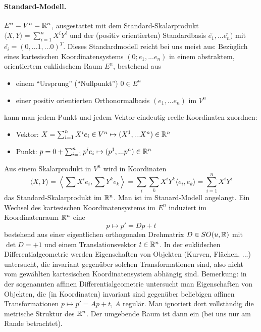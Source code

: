   \paragraph*{Standard-Modell.} \(E^n = V^n = \mathbb{R}^n\), ausgestattet mit dem Standard-Skalarprodukt \(\langle X, Y \rangle = \sum_{i=1}^n X^iY^i\) und der (positiv orientierten) Standardbasis \(\overset{\circ}{e_1}, ... \overset{\circ}{e_n})\) mit \(\overset{\circ}{e_i} = (0, ... 1, ... 0)^T\).
  Dieses Standardmodell reicht bei uns meist aus:
  Bezüglich eines kartesischen Koordinatensystems \((0; e_1, ... e_n)\) in einem abstraktem, orientiertem euklidschem Raum \(E^n\), bestehend aus 
  \begin{itemize}
   \item einem "`Ursprung"' ("`Nullpunkt"') \(0 \in E^n\)
   \item einer positiv orientierten Orthonormalbasis \((e_1, ... e_n)\) im \(V^n\)
  \end{itemize}
  kann man jedem Punkt und jedem Vektor eindeutig reelle Koordinaten zuordnen:
  \begin{itemize}
   \item Vektor: \(X = \sum_{i=1}^n X^ie_i \in V^n \mapsto (X^1, ... X^n) \in \mathbb{R}^n\)
   \item Punkt: \(p = 0 + \sum_{i=1}^n p^ie_i \mapsto (p^1, ... p^n) \in \mathbb{R}^n\)
  \end{itemize}
  Aus einem Skalarprodukt in \(V^n\) wird in Koordinaten
  \[
   \langle X, Y \rangle = \left\langle \sum X^ie_i, \sum Y^ke_k \right\rangle = \sum_{i}\sum_{k} X^iY^k \langle e_i, e_k \rangle = \sum_{i=1}^n X^iY^i
  \]
  das Standard-Skalarprodukt im \(\mathbb{R}^n\).
  Man ist im Stanard-Modell angelangt.
  Ein Wechsel des kartesischen Koordinatensystems im \(E^n\) induziert im Koordinatenraum \(\mathbb{R}^n\) eine  \[p \mapsto p' = Dp + t\] bestehend aus einer eigentlichen orthogonalen Drehmatrix \(D \in SO(u, \mathbb{R})\) mit \(\det D = +1\) und einem Translationsvektor \(t \in \mathbb{R}^n\).
  In der euklidschen Differentialgeometrie werden Eigenschaften von Objekten (Kurven, Flächen, ...) untersucht, die invariant gegenüber solchen Transformationen sind, also nicht vom gewählten kartesischen Koordinatensystem abhängig sind.
  Bemerkung: in der sogenannten affinen Differentialgeometrie untersucht man Eigenschaften von Objekten, die (in Koordinaten) invariant sind gegenüber beliebigen affinen Transformationen \(p \mapsto p' = Ap + t\), \(A\) regulär. Man ignoriert dort vollständig die metrische Struktur des \(\mathbb{R}^n\).
  Der umgebende Raum ist dann ein  (bei uns nur am Rande betrachtet).
  

